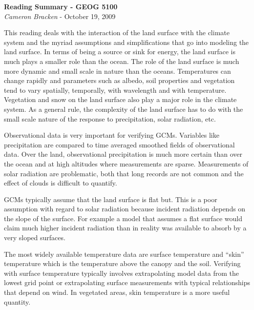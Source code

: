 \documentclass[11pt,oneside]{article}
\begin{document}
\begin{center}
	\textbf{Reading Summary - GEOG 5100}\\
	{\itshape Cameron Bracken} - October 19, 2009
\end{center}

This reading deals with the interaction of the land surface with the climate system and the myriad assumptions and simplifications that go into modeling the land surface. In terms of being a source or sink for energy, the land surface is much plays a smaller role than the ocean. The role of the land surface is much more dynamic and small scale in nature than the oceans.  Temperatures can change rapidly and parameters such as albedo, soil properties and vegetation tend to vary spatially, temporally, with wavelength and with temperature.  Vegetation and snow on the land surface also play a major role in the climate system.  As a general rule, the complexity of the land surface has to do with the small scale nature of the response to precipitation, solar radiation, etc. 

Observational data is very important for verifying GCMs.  Variables like precipitation are compared to time averaged smoothed fields of observational data.  Over the land, observational precipitation is much more certain than over the ocean and at high altitudes where measurements are sparse.  Measurements of solar radiation are problematic, both that long records are not common and the effect of clouds is difficult to quantify.  

GCMs typically assume that the land surface is flat but.  This is a poor assumption with regard to solar radiation because incident radiation depends on the slope of the surface. For example a model that assumes a flat surface would claim much higher incident radiation than in reality was available to absorb by a very sloped surfaces.  

The most widely available temperature data are surface temperature and ``skin'' temperature which is the temperature above the canopy and the soil.  Verifying with surface temperature typically involves extrapolating model data from the lowest grid point or extrapolating surface measurements with typical relationships that depend on wind.  In vegetated areas, skin temperature is a more useful quantity.
\end{document}
